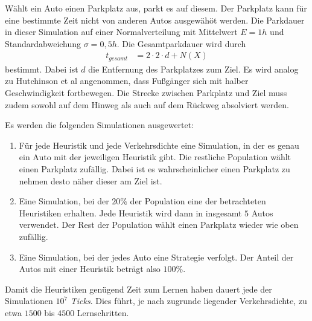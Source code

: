 Wählt ein Auto einen Parkplatz aus, parkt es auf diesem. Der Parkplatz kann für eine bestimmte Zeit nicht von anderen Autos ausgewähöt werden. Die Parkdauer in dieser Simulation auf einer Normalverteilung mit Mittelwert $E=1h$ und Standardabweichung $\sigma = 0,5h$. Die Gesamtparkdauer wird durch 
\begin{align}
t_{gesamt} &= 2\cdot 2\cdot d + N(X)
\end{align}
bestimmt. Dabei ist $d$ die Entfernung des Parkplatzes zum Ziel. Es wird analog zu Hutchinson et al angenommen, dass Fußgänger sich mit halber Geschwindigkeit fortbewegen. Die Strecke zwischen Parkplatz und Ziel muss zudem sowohl auf dem Hinweg als auch auf dem Rückweg absolviert werden.

Es werden die folgenden Simulationen ausgewertet:
\begin{enumerate}
	\item Für jede Heuristik und jede Verkehrsdichte eine Simulation, in der es genau ein Auto mit der jeweiligen Heuristik gibt. Die restliche Population wählt einen Parkplatz zufällig. Dabei ist es wahrscheinlicher einen Parkplatz zu nehmen desto näher dieser am Ziel ist.
	\item Eine Simulation, bei der $20\%$ der Population eine der betrachteten Heuristiken erhalten. Jede Heuristik wird dann in insgesamt $5$ Autos verwendet. Der Rest der Population wählt einen Parkplatz wieder wie oben zufällig. 
	\item Eine Simulation, bei der jedes Auto eine Strategie verfolgt. Der Anteil der Autos mit einer Heuristik beträgt also $100\%$.
\end{enumerate}
Damit die Heuristiken genügend Zeit zum Lernen haben dauert jede der Simulationen $10^7$ \emph{Ticks}. Dies führt, je nach zugrunde liegender Verkehrsdichte, zu etwa $1500$ bis $4500$ Lernschritten. 
